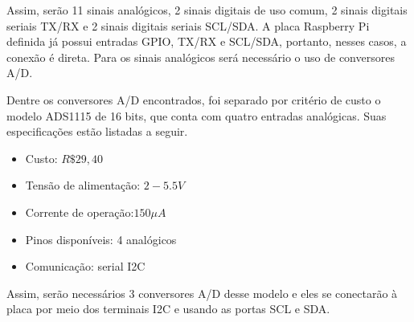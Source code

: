 	Assim, serão 11 sinais analógicos, 2 sinais digitais de uso comum, 2 sinais digitais seriais TX/RX e 2 sinais digitais seriais SCL/SDA. A placa Raspberry Pi definida já possui entradas GPIO, TX/RX e SCL/SDA, portanto, nesses casos, a conexão é direta. Para os sinais analógicos será necessário o uso de conversores A/D.
	
	Dentre os conversores A/D encontrados, foi separado por critério de custo o modelo ADS1115 de 16 bits, que conta com quatro entradas analógicas. Suas especificações estão listadas a seguir.
	
	\begin{itemize}
		\item Custo: $R\$ 29,40$
		\item Tensão de alimentação: $2 - 5.5V$
		\item Corrente de operação:$150 \mu A$
		\item Pinos disponíveis: 4 analógicos
		\item Comunicação: serial I2C
	\end{itemize}
	
	Assim, serão necessários 3 conversores A/D desse modelo e eles se conectarão à placa por meio dos terminais I2C e usando as portas SCL e SDA.
	
	